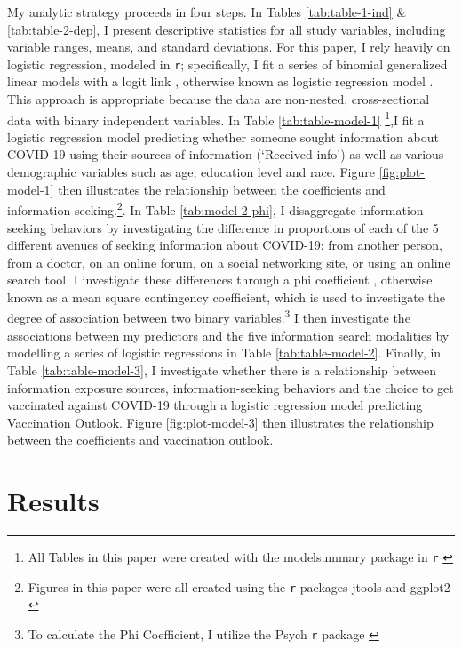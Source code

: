 My analytic strategy proceeds in four steps. In Tables \ref{tab:table-1-ind}
\& \ref{tab:table-2-dep}, I present descriptive statistics for all study
variables, including variable ranges, means, and standard deviations. For this
paper, I rely heavily on logistic regression, modeled in \texttt{r}; specifically, I
fit a series of binomial generalized linear models with a logit link \citep{venables2002a},
otherwise known as logistic regression model \citep{hothorn2006handbook}.
This approach is appropriate because the data
are non-nested, cross-sectional data with binary independent variables. In Table \ref{tab:table-model-1}
\footnote{All Tables in this paper were created with the modelsummary package in \texttt{r} 
\citep{modelsummary}},I fit a logistic regression model predicting
whether someone sought information about COVID-19 using their sources of
information (`Received info') as well as various demographic variables such as
age, education level and race. Figure \ref{fig:plot-model-1} then illustrates
the relationship between the coefficients and information-seeking.\footnote{Figures 
in this paper were all created using the \texttt{r} packages jtools \citep{jtools}
and ggplot2 \citep{wickham_etal, wickham11}}.
In Table \ref{tab:model-2-phi}, I disaggregate information-seeking behaviors by
investigating the difference in proportions of each of the 5 different avenues
of seeking information about COVID-19: from another person, from a doctor, on an
online forum, on a social networking site, or using an online search tool. I
investigate these differences through a phi coefficient \citep{warrens08}, otherwise
known as a mean square contingency coefficient, which is used to investigate the
degree of association between two binary variables.\footnote{To calculate the Phi
  Coefficient, I utilize the Psych \texttt{r} package \citep{psych}} I then investigate the
associations between my predictors and the five information search modalities by
modelling a series of logistic regressions in Table \ref{tab:table-model-2}.
Finally, in Table \ref{tab:table-model-3}, I investigate whether there is a
relationship between information exposure sources, information-seeking behaviors and
the choice to get vaccinated against COVID-19 through a logistic regression
model predicting Vaccination Outlook. Figure \ref{fig:plot-model-3} then
illustrates the relationship between the coefficients and vaccination outlook.

\hypertarget{results}{%
\section{Results}\label{results}}

